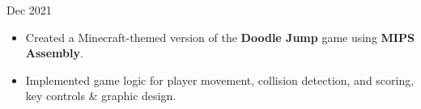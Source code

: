 \documentclass[10pt,a4paper,ragged2e,withhyper]{altacv}
\begin{document}
\begin{paracol}{2}
\begin{itemize}
    \end{itemize}

    \vspace{-5pt}
    \divider{}
    {Dec 2021 }{}
    \begin{itemize}
        \item Created a Minecraft-themed version of the \textbf{Doodle Jump} game using \textbf{MIPS Assembly}.
        \item Implemented game logic for player movement, collision detection, and scoring, key controls \& graphic design.
    \end{itemize}










\end{paracol}
\end{document}
